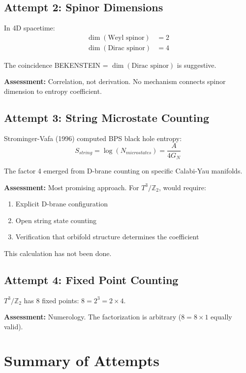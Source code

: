 \documentclass[12pt,a4paper]{article}
\begin{document}
\subsection{Attempt 2: Spinor Dimensions}

In 4D spacetime:
\begin{align}
\dim(\text{Weyl spinor}) &= 2 \\
\dim(\text{Dirac spinor}) &= 4
\end{align}

The coincidence BEKENSTEIN = $\dim(\text{Dirac spinor})$ is suggestive.

\textbf{Assessment:} Correlation, not derivation. No mechanism connects spinor dimension to entropy coefficient.

\subsection{Attempt 3: String Microstate Counting}

Strominger-Vafa (1996) computed BPS black hole entropy:
\begin{equation}
S_{string} = \log(N_{microstates}) = \frac{A}{4G_N}
\end{equation}

The factor 4 emerged from D-brane counting on specific Calabi-Yau manifolds.

\textbf{Assessment:} Most promising approach. For $T^3/\mathbb{Z}_2$, would require:
\begin{enumerate}
    \item Explicit D-brane configuration
    \item Open string state counting
    \item Verification that orbifold structure determines the coefficient
\end{enumerate}

This calculation has not been done.

\subsection{Attempt 4: Fixed Point Counting}

$T^3/\mathbb{Z}_2$ has 8 fixed points: $8 = 2^3 = 2 \times 4$.

\textbf{Assessment:} Numerology. The factorization is arbitrary ($8 = 8 \times 1$ equally valid).

\section{Summary of Attempts}
\end{document}
